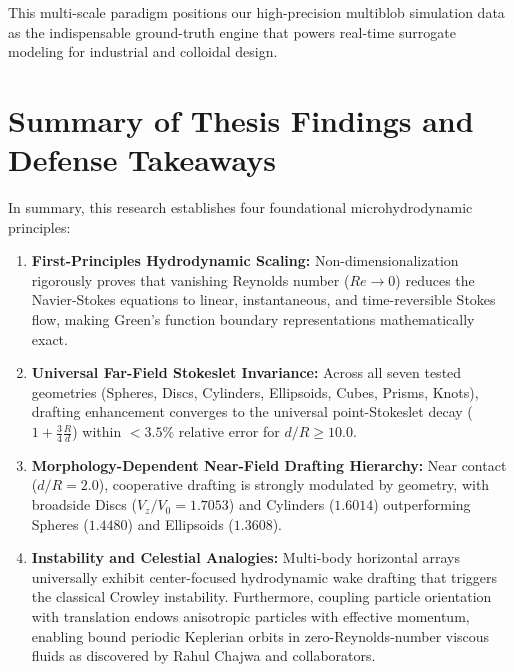 \documentclass[11pt,a4paper]{article}
\begin{document}
This multi-scale paradigm positions our high-precision multiblob simulation data as the indispensable ground-truth engine that powers real-time surrogate modeling for industrial and colloidal design.

\section{Summary of Thesis Findings and Defense Takeaways}

In summary, this research establishes four foundational microhydrodynamic principles:
\begin{enumerate}
    \item \textbf{First-Principles Hydrodynamic Scaling:} Non-dimensionalization rigorously proves that vanishing Reynolds number ($Re \to 0$) reduces the Navier-Stokes equations to linear, instantaneous, and time-reversible Stokes flow, making Green's function boundary representations mathematically exact.
    \item \textbf{Universal Far-Field Stokeslet Invariance:} Across all seven tested geometries (Spheres, Discs, Cylinders, Ellipsoids, Cubes, Prisms, Knots), drafting enhancement converges to the universal point-Stokeslet decay ($1 + \frac{3}{4}\frac{R}{d}$) within $< 3.5\%$ relative error for $d/R \ge 10.0$.
    \item \textbf{Morphology-Dependent Near-Field Drafting Hierarchy:} Near contact ($d/R = 2.0$), cooperative drafting is strongly modulated by geometry, with broadside Discs ($V_z/V_0 = 1.7053$) and Cylinders ($1.6014$) outperforming Spheres ($1.4480$) and Ellipsoids ($1.3608$).
    \item \textbf{Instability and Celestial Analogies:} Multi-body horizontal arrays universally exhibit center-focused hydrodynamic wake drafting that triggers the classical Crowley instability. Furthermore, coupling particle orientation with translation endows anisotropic particles with effective momentum, enabling bound periodic Keplerian orbits in zero-Reynolds-number viscous fluids as discovered by Rahul Chajwa and collaborators.
\end{enumerate}
\end{document}

